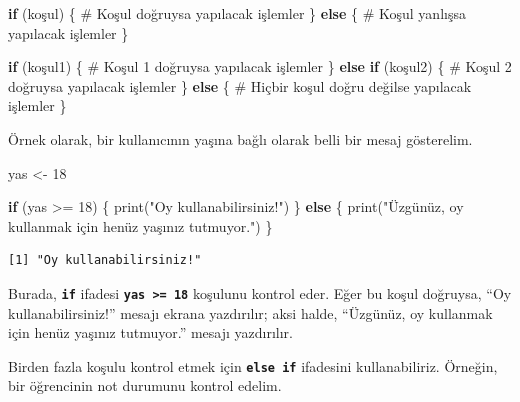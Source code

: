 \documentclass[
  letterpaper,
  DIV=11,
  numbers=noendperiod]{scrreprt}
\newenvironment{Shaded}{\begin{snugshade}}{\end{snugshade}}
\newcommand{\CommentTok}[1]{\textcolor[rgb]{0.37,0.37,0.37}{#1}}
\newcommand{\ControlFlowTok}[1]{\textcolor[rgb]{0.00,0.23,0.31}{\textbf{#1}}}
\newcommand{\DecValTok}[1]{\textcolor[rgb]{0.68,0.00,0.00}{#1}}
\newcommand{\FunctionTok}[1]{\textcolor[rgb]{0.28,0.35,0.67}{#1}}
\newcommand{\NormalTok}[1]{\textcolor[rgb]{0.00,0.23,0.31}{#1}}
\newcommand{\OtherTok}[1]{\textcolor[rgb]{0.00,0.23,0.31}{#1}}
\newcommand{\SpecialCharTok}[1]{\textcolor[rgb]{0.37,0.37,0.37}{#1}}
\newcommand{\StringTok}[1]{\textcolor[rgb]{0.13,0.47,0.30}{#1}}
\begin{document}
\begin{Shaded}
\begin{Highlighting}[]
\ControlFlowTok{if}\NormalTok{ (koşul) \{}
  \CommentTok{\# Koşul doğruysa yapılacak işlemler}
\NormalTok{\} }\ControlFlowTok{else}\NormalTok{ \{}
  \CommentTok{\# Koşul yanlışsa yapılacak işlemler}
\NormalTok{\}}
\end{Highlighting}
\end{Shaded}

\begin{Shaded}
\begin{Highlighting}[]
\ControlFlowTok{if}\NormalTok{ (koşul1) \{}
  \CommentTok{\# Koşul 1 doğruysa yapılacak işlemler}
\NormalTok{\} }\ControlFlowTok{else} \ControlFlowTok{if}\NormalTok{ (koşul2) \{}
  \CommentTok{\# Koşul 2 doğruysa yapılacak işlemler}
\NormalTok{\} }\ControlFlowTok{else}\NormalTok{ \{}
  \CommentTok{\# Hiçbir koşul doğru değilse yapılacak işlemler}
\NormalTok{\}}
\end{Highlighting}
\end{Shaded}

Örnek olarak, bir kullanıcının yaşına bağlı olarak belli bir mesaj
gösterelim.

\begin{Shaded}
\begin{Highlighting}[]
\NormalTok{yas }\OtherTok{\textless{}{-}} \DecValTok{18}

\ControlFlowTok{if}\NormalTok{ (yas }\SpecialCharTok{\textgreater{}=} \DecValTok{18}\NormalTok{) \{}
  \FunctionTok{print}\NormalTok{(}\StringTok{"Oy kullanabilirsiniz!"}\NormalTok{)}
\NormalTok{\} }\ControlFlowTok{else}\NormalTok{ \{}
  \FunctionTok{print}\NormalTok{(}\StringTok{"Üzgünüz, oy kullanmak için henüz yaşınız tutmuyor."}\NormalTok{)}
\NormalTok{\}}
\end{Highlighting}
\end{Shaded}

\begin{verbatim}
[1] "Oy kullanabilirsiniz!"
\end{verbatim}

Burada, \textbf{\texttt{if}} ifadesi
\textbf{\texttt{yas\ \textgreater{}=\ 18}} koşulunu kontrol eder. Eğer
bu koşul doğruysa, ``Oy kullanabilirsiniz!'' mesajı ekrana yazdırılır;
aksi halde, ``Üzgünüz, oy kullanmak için henüz yaşınız tutmuyor.''
mesajı yazdırılır.

Birden fazla koşulu kontrol etmek için \textbf{\texttt{else\ if}}
ifadesini kullanabiliriz. Örneğin, bir öğrencinin not durumunu kontrol
edelim.
\end{document}
